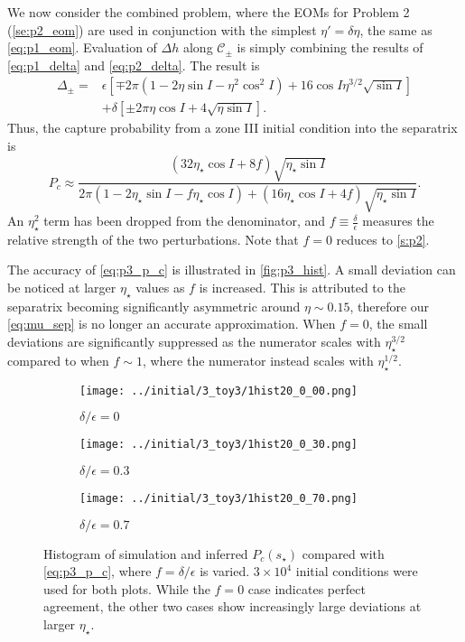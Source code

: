 \documentclass[
        fleqn,
        usenatbib,
    ]{mnras}
\newcommand*{\p}[1]{\left(#1\right)}
\newcommand*{\s}[1]{\left[#1\right]}
\begin{document}
We now consider the combined problem, where the EOMs for Problem 2
(\autoref{se:p2_eom}) are used in conjunction with the simplest $\eta' = \delta
\eta$, the same as \autoref{eq:p1_eom}. Evaluation of $\Delta h$ along
$\mathcal{C}_{\pm}$ is simply combining the results of \autoref{eq:p1_delta} and
\autoref{eq:p2_delta}. The result is
\begin{align}
    \Delta_{\pm} ={}& \epsilon\s{
        \mp 2\pi \p{1 - 2\eta \sin I - \eta^2 \cos^2 I}
            + 16\cos I\eta^{3/2}\sqrt{\sin I}}\nonumber\\
        &+ \delta \s{\pm 2\pi \eta \cos I + 4\sqrt{\eta \sin I}}.
\end{align}
Thus, the capture probability from a zone III initial condition into the
separatrix is
\begin{equation}
    P_c \approx \frac{\p{32 \eta_\star \cos I + 8f}\sqrt{\eta_\star \sin I}}{
        2\pi\p{1 - 2\eta_{\star}\sin I - f\eta_\star \cos I}
            + \p{16\eta_\star\cos I + 4f} \sqrt{\eta_\star\sin I}}.
            \label{eq:p3_p_c}
\end{equation}
An $\eta_\star^2$ term has been dropped from the denominator, and $f \equiv
\frac{\delta}{\epsilon}$ measures the relative strength of the two
perturbations. Note that $f = 0$ reduces to \autoref{s:p2}.

The accuracy of \autoref{eq:p3_p_c} is illustrated in \autoref{fig:p3_hist}. A
small deviation can be noticed at larger $\eta_\star$ values as $f$ is
increased. This is attributed to the separatrix becoming significantly
asymmetric around $\eta \sim 0.15$, therefore our \autoref{eq:mu_sep} is no
longer an accurate approximation. When $f = 0$, the small deviations are
significantly suppressed as the numerator scales with $\eta_\star^{3/2}$
compared to when $f \sim 1$, where the numerator instead scales with
$\eta_{\star}^{1/2}$.
\begin{figure}
    \centering
    \begin{subfigure}{\columnwidth}
        \centering
        \texttt{[image: ../initial/3\_toy3/1hist20\_0\_00.png]}
        \caption{$\delta/\epsilon = 0$}
    \end{subfigure}

    \begin{subfigure}{\columnwidth}
        \centering
        \texttt{[image: ../initial/3\_toy3/1hist20\_0\_30.png]}
        \caption{$\delta/\epsilon = 0.3$}
    \end{subfigure}

    \begin{subfigure}{\columnwidth}
        \centering
        \texttt{[image: ../initial/3\_toy3/1hist20\_0\_70.png]}
        \caption{$\delta/\epsilon = 0.7$}
    \end{subfigure}
    \caption{Histogram of simulation and inferred $P_c(s_\star)$ compared with
    \autoref{eq:p3_p_c}, where $f = \delta/\epsilon$ is varied. $3 \times 10^4$
    initial conditions were used for both plots. While the $f = 0$ case
    indicates perfect agreement, the other two cases show increasingly large
    deviations at larger $\eta_\star$.}\label{fig:p3_hist}
\end{figure}
\end{document}
